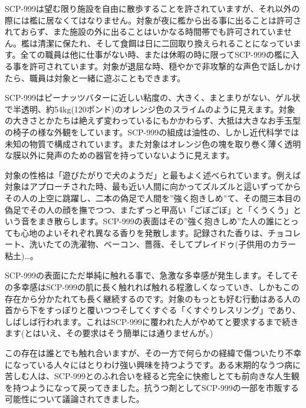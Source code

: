 \documentclass[10pt,a4paper]{jarticle}
\author{ProfSnider}
\begin{document}
\header

\vspace{10pt}

{\fontsize{12pt}{20pt}\selectfont{\bf 特別収容プロトコル}}

\scppicture

SCP-999は望む限り施設を自由に散歩することを許されていますが、それ以外の際には檻に居なくてはなりません。対象が夜に檻から出る事に出ることは許可されておらず、また施設の外に出ることはいかなる時間帯でも許可されていません。檻は清潔に保たれ、そして食餌は日に二回取り換えられることになっています。全ての職員は他に仕事がない時、または休暇の時に限ってSCP-999の檻に入る事を許可されています。対象が退屈な時、穏やかで非攻撃的な声色で話しかけたら、職員は対象と一緒に遊ぶこともできます。

\vspace{10pt}

{\fontsize{12pt}{20pt}\selectfont{\bf 説明}}

SCP-999はピーナッツバターに近しい粘度の、大きく、まとまりがない、ゲル状で半透明、約54kg(120ポンド)のオレンジ色のスライムのように見えます。対象の大きさとかたちは絶えず変わっているにもかかわらず、大抵は大きなお手玉型の椅子の様な外観をしています。SCP-999の組成は油性の、しかし近代科学では未知の物質で構成されています。また対象はオレンジ色の塊を取り巻く薄く透明な膜以外に発声のための器官を持っていないように見えます。

対象の性格は「遊びたがりで犬のようだ」と最もよく述べられています。例えば対象はアプローチされた時、最も近い人間に向かってズルズルと這いずってからその人の上空に跳躍し、二本の偽足で人間を''強く抱きしめ''て、その間三本目の偽足でその人の顔を撫でつつ、またずっと甲高い「ごぼごぼ」と「くうくう」という音をまき散らします。SCP-999の表面はその''強く抱きしめ''た人の誰にとっても心地のよいそれぞれ異なる香りを発散します。記録された香りは、チョコレート、洗いたての洗濯物、ベーコン、薔薇、そしてプレイドゥ(子供用のカラー粘土)…。

SCP-999の表面にただ単純に触れる事で、急激な多幸感が発生します。そしてその多幸感はSCP-999の肌に長く触れれば触れる程激しくなっていき、しかもこの存在から分かたれても長く継続するのです。対象のもっとも好む行動はある人の首から下をすっぽりと覆いつつそしてくすぐる「くすぐりレスリング」であり、しばしば行われます。これはSCP-999に覆われた人がやめてと要求するまで続きます(とはいえ、その要求はそう簡単には通りませんが。)

この存在は誰とでも触れ合いますが、その一方で何らかの経緯で傷ついたり不幸になっている人々にはとりわけ強い興味を持つようです。ある末期的なうつ病に苦しむ人は、SCP-999とのふれ合いを経ると完全に快癒しとても前向きな人生観を持つようになって戻ってきました。抗うつ剤としてSCP-999の一部を市販する可能性について議論されてきました。
\end{document}
